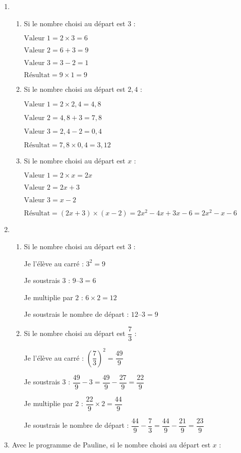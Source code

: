 \begin{enumerate}
\item 
\begin{enumerate}
	\item Si le nombre choisi au départ est $3$ : 
	
	$\text{Valeur 1} = 2 \times 3 = 6$
	
	$\text{Valeur 2} = 6 + 3 =9$
	
	$\text{Valeur 3} = 3 - 2 = 1$
	
	$\text{Résultat} = 9 \times 1 = 9$ 
	\item Si le nombre choisi au départ est $2,4$ : 
	
	$\text{Valeur 1} = 2 \times 2,4 = 4,8$
	
	$\text{Valeur 2} = 4,8 + 3 = 7,8$
	
	$\text{Valeur 3} = 2,4 - 2 = 0,4$
	
	$\text{Résultat} = 7,8 \times 0,4 = 3,12$
	
	\item Si le nombre choisi au départ est $x$ : 
	
	$\text{Valeur 1} = 2 \times x = 2x$
	
	$\text{Valeur 2} = 2x+3$
	
	$\text{Valeur 3} = x-2$
	
	$\text{Résultat} = (2x+3)\times (x-2) = 2x^2-4x+3x-6 = 2x^2-x-6$
\end{enumerate}
\item 
\begin{enumerate}
	\item Si le nombre choisi au départ est $3$ :
	
	Je l’élève au carré : $3^2 = 9$
	
	Je soustrais $3$ : $9 – 3 = 6$
	
	Je multiplie par $2$ : $6 \times 2 = 12$
	
	Je soustrais le nombre de départ : $12 – 3 = 9$
	\item Si le nombre choisi au départ est $\dfrac{7}{3}$ :
	
	Je l’élève au carré : $\left(\dfrac{7}{3}\right)^2=\dfrac{49}{9}$
	
	Je soustrais $3$ : $ \dfrac{49}{9}-3 = \dfrac{49}{9}-\dfrac{27}{9} = \dfrac{22}{9}$
	
	Je multiplie par $2$ : $\dfrac{22}{9}\times 2 = \dfrac{44}{9}$
	
	Je soustrais le nombre de départ : $\dfrac{44}{9}-\dfrac{7}{3}=\dfrac{44}{9}-\dfrac{21}{9}=\dfrac{23}{9}$
\end{enumerate}
\item Avec le programme de Pauline, si le nombre choisi au départ est $x$ : 


\end{enumerate}
